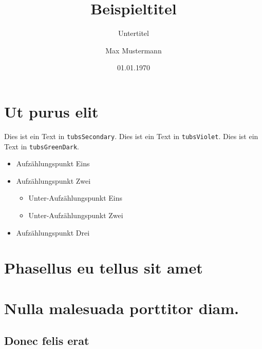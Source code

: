 \documentclass[%
  a4paper,%
  11pt,%
]{scrartcl}
\title{Beispieltitel}
\subtitle{Untertitel}
\author{Max Mustermann}
\date{01.01.1970}
\begin{document}
\maketitle%

\tableofcontents


\section{Ut purus elit}

\textcolor{tubsSecondary}{Dies ist ein Text in \texttt{tubsSecondary}.}
\textcolor{tubsViolet}{Dies ist ein Text in \texttt{tubsViolet}.}
\textcolor{tubsGreenDark}{Dies ist ein Text in \texttt{tubsGreenDark}.}\bigskip

\lipsum[1]

\begin{itemize}
  \item Aufzählungspunkt Eins
  \item Aufzählungspunkt Zwei
    \begin{itemize}
      \item Unter-Aufzählungspunkt Eins
      \item Unter-Aufzählungspunkt Zwei
    \end{itemize}
  \item Aufzählungspunkt Drei
\end{itemize}

\section{Phasellus eu tellus sit amet}

\lipsum[2-5]

\section{Nulla malesuada porttitor diam.}

\lipsum[1-3]

\subsection{Donec felis erat}

\lipsum[4-7]
\end{document}
